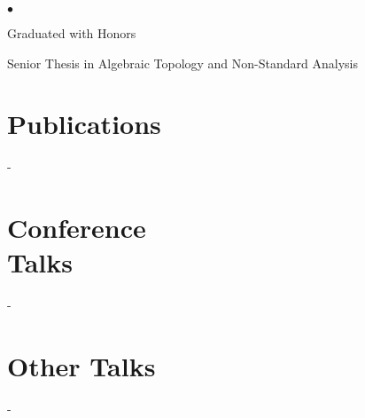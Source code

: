 \documentclass[margin,line,pifont,palatino,courier]{res}
\newenvironment{list1}{
  \begin{list}{\ding{113}}{%
      \setlength{\itemsep}{0in}
      \setlength{\parsep}{0in} \setlength{\parskip}{0in}
      \setlength{\topsep}{0in} \setlength{\partopsep}{0in}
      \setlength{\leftmargin}{0.17in}}}{\end{list}}
\newenvironment{list2}{
  \begin{list}{$\bullet$}{%
      \setlength{\itemsep}{0in}
      \setlength{\parsep}{0in} \setlength{\parskip}{0in}
      \setlength{\topsep}{0in} \setlength{\partopsep}{0in}
      \setlength{\leftmargin}{0.2in}}}{\end{list}}
\begin{document}
\begin{resume}
\begin{list1}
\begin{list2}
\vspace*{.05in}
\item Graduated with Honors
\item Senior Thesis in Algebraic Topology and Non-Standard Analysis
\end{list2}

\end{list1}






\section{\sc Publications} -





\section{\sc Conference \\ Talks} -








\section{\sc Other Talks} -





\end{resume}
\end{document}
